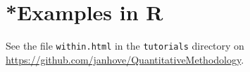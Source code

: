 \documentclass[a4paper]{tufte-book}\usepackage[]{graphicx}\usepackage[]{xcolor}
\begin{document}
\section{*Examples in R}
See the file \texttt{within.html} in the \texttt{tutorials} directory
on \url{https://github.com/janhove/QuantitativeMethodology}.




% 
%   
%           
%           
%             
\end{document}
